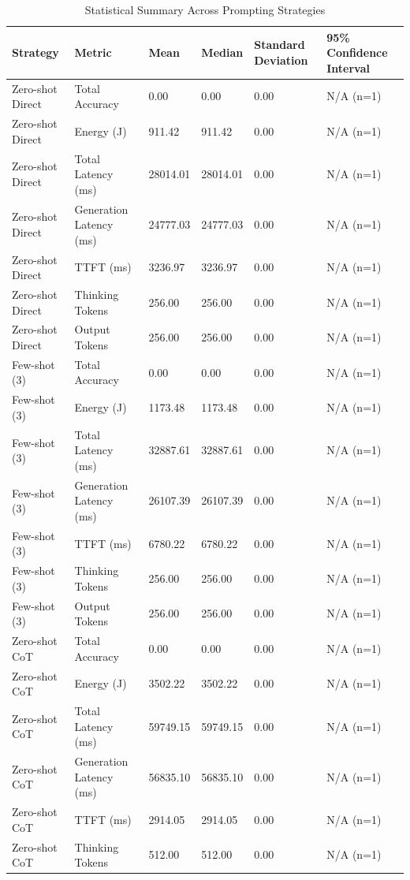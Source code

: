 \begin{table}
\caption{Statistical Summary Across Prompting Strategies}
\label{tab:statistical_summary}
\begin{tabular}{llllll}
\toprule
Strategy & Metric & Mean & Median & Standard Deviation & 95\% Confidence Interval \\
\midrule
Zero-shot Direct & Total Accuracy & 0.00 & 0.00 & 0.00 & N/A (n=1) \\
Zero-shot Direct & Energy (J) & 911.42 & 911.42 & 0.00 & N/A (n=1) \\
Zero-shot Direct & Total Latency (ms) & 28014.01 & 28014.01 & 0.00 & N/A (n=1) \\
Zero-shot Direct & Generation Latency (ms) & 24777.03 & 24777.03 & 0.00 & N/A (n=1) \\
Zero-shot Direct & TTFT (ms) & 3236.97 & 3236.97 & 0.00 & N/A (n=1) \\
Zero-shot Direct & Thinking Tokens & 256.00 & 256.00 & 0.00 & N/A (n=1) \\
Zero-shot Direct & Output Tokens & 256.00 & 256.00 & 0.00 & N/A (n=1) \\
Few-shot (3) & Total Accuracy & 0.00 & 0.00 & 0.00 & N/A (n=1) \\
Few-shot (3) & Energy (J) & 1173.48 & 1173.48 & 0.00 & N/A (n=1) \\
Few-shot (3) & Total Latency (ms) & 32887.61 & 32887.61 & 0.00 & N/A (n=1) \\
Few-shot (3) & Generation Latency (ms) & 26107.39 & 26107.39 & 0.00 & N/A (n=1) \\
Few-shot (3) & TTFT (ms) & 6780.22 & 6780.22 & 0.00 & N/A (n=1) \\
Few-shot (3) & Thinking Tokens & 256.00 & 256.00 & 0.00 & N/A (n=1) \\
Few-shot (3) & Output Tokens & 256.00 & 256.00 & 0.00 & N/A (n=1) \\
Zero-shot CoT & Total Accuracy & 0.00 & 0.00 & 0.00 & N/A (n=1) \\
Zero-shot CoT & Energy (J) & 3502.22 & 3502.22 & 0.00 & N/A (n=1) \\
Zero-shot CoT & Total Latency (ms) & 59749.15 & 59749.15 & 0.00 & N/A (n=1) \\
Zero-shot CoT & Generation Latency (ms) & 56835.10 & 56835.10 & 0.00 & N/A (n=1) \\
Zero-shot CoT & TTFT (ms) & 2914.05 & 2914.05 & 0.00 & N/A (n=1) \\
Zero-shot CoT & Thinking Tokens & 512.00 & 512.00 & 0.00 & N/A (n=1) \\

\end{tabular}
\end{table}
